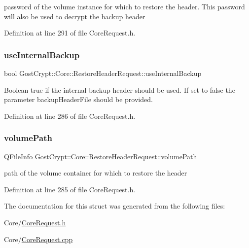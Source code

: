 password of the volume instance for which to restore the header. This password will also be used to decrypt the backup header 

Definition at line 291 of file Core\+Request.\+h.

\mbox{\label{struct_gost_crypt_1_1_core_1_1_restore_header_request_a292294e077bb9c0b213941345d64c18c}} 
\subsubsection{\texorpdfstring{use\+Internal\+Backup}{useInternalBackup}}
{\footnotesize\ttfamily bool Gost\+Crypt\+::\+Core\+::\+Restore\+Header\+Request\+::use\+Internal\+Backup}

Boolean true if the internal backup header should be used. If set to false the parameter backup\+Header\+File should be provided. 

Definition at line 286 of file Core\+Request.\+h.

\mbox{\label{struct_gost_crypt_1_1_core_1_1_restore_header_request_ad80334ccac055814a5d53569e21b9bc3}} 
\subsubsection{\texorpdfstring{volume\+Path}{volumePath}}
{\footnotesize\ttfamily Q\+File\+Info Gost\+Crypt\+::\+Core\+::\+Restore\+Header\+Request\+::volume\+Path}

path of the volume container for which to restore the header 

Definition at line 285 of file Core\+Request.\+h.



The documentation for this struct was generated from the following files\+:\begin{DoxyCompactItemize}
\item 
Core/\hyperlink{_core_request_8h}{Core\+Request.\+h}\item 
Core/\hyperlink{_core_request_8cpp}{Core\+Request.\+cpp}\end{DoxyCompactItemize}
